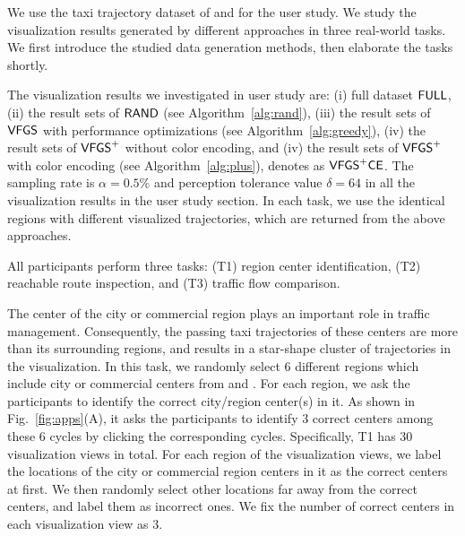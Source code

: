 We use the taxi trajectory dataset of \pt{} and \sz{} for the user study.
We study the visualization results generated by different approaches in three real-world tasks.
We first introduce the studied data generation methods, then elaborate the tasks shortly.

The visualization results we investigated in user study are: (i) full dataset $\mathsf{FULL}$,
(ii) the result sets of $\mathsf{RAND}$ (see Algorithm~\ref{alg:rand}),
(iii) the result sets of $\mathsf{VFGS}$ with performance optimizations (see Algorithm~\ref{alg:greedy}),
(iv) the result sets of $\mathsf{VFGS}^{+}$ without color encoding,
and (iv) the result sets of $\mathsf{VFGS}^{+}$ with color encoding (see Algorithm~\ref{alg:plus}), denotes as $\mathsf{VFGS}^{+}\mathsf{CE}$.
The sampling rate is $\alpha = 0.5\%$ and perception tolerance value $\delta = 64$ in all the visualization results in the user study section.
In each task, we use the identical regions with different visualized trajectories, which are returned from the above approaches.


All participants perform three tasks:  (T1) region center identification, (T2) reachable route inspection, and (T3) traffic flow comparison.

The {center of the city or commercial region} plays an important role in traffic management.
Consequently, the passing taxi trajectories of these centers are more than its surrounding regions, and results in a star-shape cluster of trajectories in the visualization.
In this task, we randomly select 6 different regions which include city or commercial centers from \pt{} and \sz{}.
For each region, we ask the participants to identify the correct city/region center(s) in it.
As shown in Fig.~\ref{fig:apps}(A), it asks the participants to identify 3 correct centers among these 6 cycles by clicking the corresponding cycles.
Specifically, T1 has 30 visualization views in total.
For each region of the visualization views,  we label the locations of the {city or commercial region} centers in it as the correct centers at first.	
We then randomly select other {locations} far away from the correct centers, and label them as incorrect ones.
We fix the number of correct centers in each visualization view as 3.



